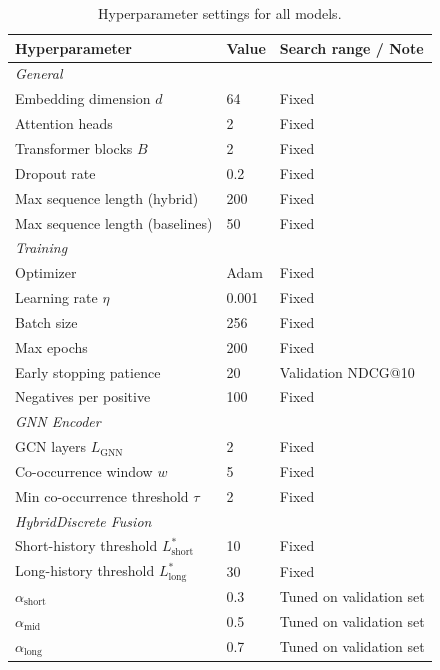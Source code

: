 \documentclass[12pt,a4paper]{report}
\begin{document}
\begin{table}[h]
\centering
\caption{Hyperparameter settings for all models.}
\label{tab:hyperparameters}
\begin{tabular}{p{5.5cm} p{2.5cm} p{4.5cm}}
\toprule
\textbf{Hyperparameter} & \textbf{Value} & \textbf{Search range / Note} \\
\midrule
\multicolumn{3}{l}{\textit{General}} \\
Embedding dimension \(d\)       & 64      & Fixed \\
Attention heads                 & 2       & Fixed \\
Transformer blocks \(B\)        & 2       & Fixed \\
Dropout rate                    & 0.2     & Fixed \\
Max sequence length (hybrid)    & 200     & Fixed \\
Max sequence length (baselines) & 50      & Fixed \\
\midrule
\multicolumn{3}{l}{\textit{Training}} \\
Optimizer                       & Adam    & Fixed \\
Learning rate \(\eta\)          & 0.001   & Fixed \\
Batch size                      & 256     & Fixed \\
Max epochs                      & 200     & Fixed \\
Early stopping patience         & 20      & Validation NDCG@10 \\
Negatives per positive          & 100     & Fixed \\
\midrule
\multicolumn{3}{l}{\textit{GNN Encoder}} \\
GCN layers \(L_{\text{GNN}}\)   & 2       & Fixed \\
Co-occurrence window \(w\)      & 5       & Fixed \\
Min co-occurrence threshold \(\tau\) & 2  & Fixed \\
\midrule
\multicolumn{3}{l}{\textit{HybridDiscrete Fusion}} \\
Short-history threshold \(L^*_{\text{short}}\) & 10 & Fixed \\
Long-history threshold \(L^*_{\text{long}}\)   & 30 & Fixed \\
\(\alpha_{\text{short}}\)       & 0.3     & Tuned on validation set \\
\(\alpha_{\text{mid}}\)         & 0.5     & Tuned on validation set \\
\(\alpha_{\text{long}}\)        & 0.7     & Tuned on validation set \\
\bottomrule
\end{tabular}
\end{table}
\end{document}
